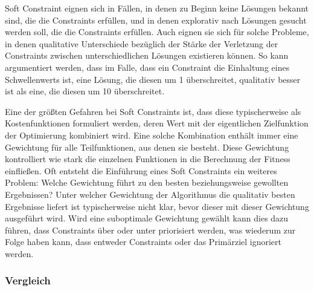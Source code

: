 Soft Constraint eignen sich in Fällen, in denen zu Beginn keine Lösungen bekannt sind, die die Constraints erfüllen, und in denen explorativ nach Lösungen gesucht werden soll, die die Constraints erfüllen.
Auch eignen sie sich für solche Probleme, in denen qualitative Unterschiede bezüglich der Stärke der Verletzung der Constraints zwischen unterschiedlichen Lösungen existieren können.
So kann argumentiert werden, dass im Falle, dass ein Constraint die Einhaltung eines Schwellenwerts ist, eine Lösung, die diesen um 1 überschreitet, qualitativ besser ist als eine, die diesen um 10 überschreitet.

Eine der größten Gefahren bei Soft Constraints ist, dass diese typischerweise als Kostenfunktionen formuliert werden, deren Wert mit der eigentlichen Zielfunktion der Optimierung kombiniert wird.
Eine solche Kombination enthält immer eine Gewichtung für alle Teilfunktionen, aus denen sie besteht.
Diese Gewichtung kontrolliert wie stark die einzelnen Funktionen in die Berechnung der Fitness einfließen.
Oft entsteht die Einführung eines Soft Constraints ein weiteres Problem:
Welche Gewichtung führt zu den besten beziehungsweise gewollten Ergebnissen?
Unter welcher Gewichtung der Algorithmus die qualitativ besten Ergebnisse liefert ist typischerweise nicht klar, bevor dieser mit dieser Gewichtung ausgeführt wird.
Wird eine suboptimale Gewichtung gewählt kann dies dazu führen, dass Constraints über oder unter priorisiert werden, was wiederum zur Folge haben kann, dass entweder Constraints oder das Primärziel ignoriert werden.


\subsubsection{Vergleich}


